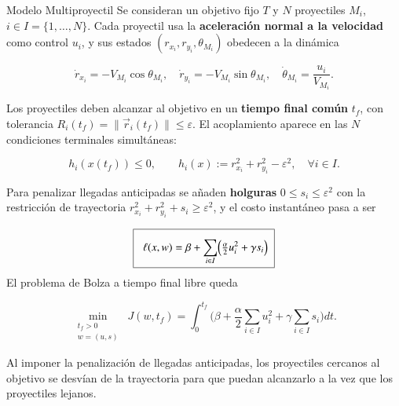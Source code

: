 \begin{block}{Modelo Multiproyectil}
	Se consideran un objetivo fijo $T$ y $N$ proyectiles $M_i$, $i\in I=\{1,\dots,N\}$.
	Cada proyectil usa la \textbf{aceleración normal a la velocidad} como control $u_i$, y
	sus estados $(r_{x_i},r_{y_i},\theta_{M_i})$ obedecen a la dinámica

	\vspace{-0.9cm}
	$$
	\dot r_{x_i}=-V_{M_i}\cos\theta_{M_i},\quad
	\dot r_{y_i}=-V_{M_i}\sin\theta_{M_i},\quad
	\dot\theta_{M_i}=\frac{u_i}{V_{M_i}}.
	$$
	
	Los proyectiles deben alcanzar al objetivo en un \textbf{tiempo final común} $t_f$, 
	con tolerancia $R_i(t_f)=\lVert\vec r_i(t_f)\rVert\le\varepsilon$. El acoplamiento
	aparece en las $N$ condiciones terminales simultáneas:
	
	\vspace{-0.9cm}
	$$
	h_i(x(t_f))\le0,\qquad h_i(x):=r_{x_i}^2+r_{y_i}^2-\varepsilon^2,
	\quad\forall i\in I.
	$$

	\vspace{0.5cm}
	\begin{exampleblock}{}

	Para penalizar llegadas anticipadas se añaden \textbf{holguras}
	$0\le s_i\le\varepsilon^2$ con la restricción de trayectoria
	$r_{x_i}^2+r_{y_i}^2+s_i\ge\varepsilon^2$, y el costo instantáneo pasa a ser
	
	\vspace{-0.9cm}
	$$
	\boxed{\;\vphantom{\frac{\frac{A}{B}}{\frac{C}{D}}}\;
	\ell(x,w)=\beta+\sum_{i\in I}\!\Big(\tfrac{\alpha}{2}u_i^2+\gamma s_i\Big)\;}
	$$
	El problema de Bolza a tiempo final libre queda

	$$
	\min_{\substack{t_f>0\\w=(u,s)}}\;
	J(w,t_f)=\int_0^{t_f}\!\Big(\beta+\frac{\alpha}{2}\sum_{i\in I}u_i^2
	+\gamma\sum_{i\in I}s_i\Big)dt.
	$$
	
	Al imponer la penalización de llegadas anticipadas, los proyectiles cercanos al objetivo
	se desvían de la trayectoria para que puedan alcanzarlo a la vez que los proyectiles lejanos.
	\end{exampleblock}

	{\def\marginimagetop{-2}
	}

\end{block}
